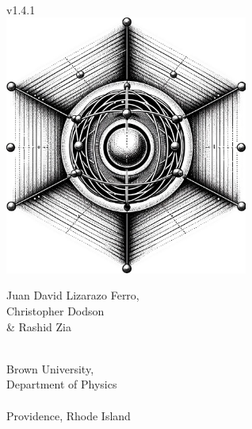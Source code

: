\documentclass[11pt, twoside,openright]{article}
\newcommand{\qversion}{v1.4.1}
\begin{document}
 

\begin{titlepage} %
    \centering
    \vspace*{\fill}
    
    {\Large\qlanth}\\
    {\large \qversion} \\
    \vspace*{0.5cm}
    \includegraphics[width=0.6\textwidth]{ion_in_lattice.jpg}  %
    \vspace*{0.4cm} %
    
    {\large Juan David Lizarazo Ferro,}\\
    {\large Christopher Dodson}\\
    {\large \& Rashid Zia}\\
    
	\vspace*{\fill}
\end{titlepage}

\newpage

\thispagestyle{empty}
\vspace*{\fill}
\begin{center}
$\,$ \\
{\large Brown University, \\ Department of Physics}\\
\vspace{0.2cm}
\hrulefill \\
\vspace{0.2cm}
Providence, Rhode Island \\
\end{center}
\end{document}
